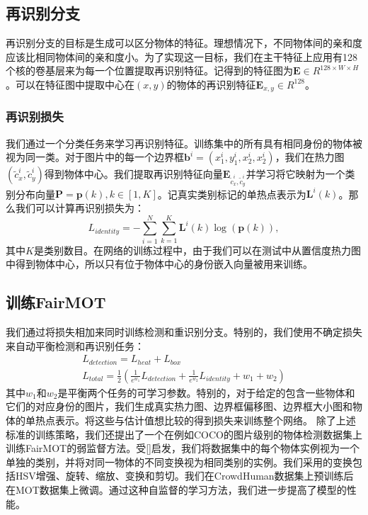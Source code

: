 \documentclass{ctexart}
\begin{document}
\subsection{再识别分支}
再识别分支的目标是生成可以区分物体的特征。理想情况下，不同物体间的亲和度应该比相同物体间的亲和度小。为了实现这一目标，我们在主干特征上应用有128个核的卷基层来为每一个位置提取再识别特征。记得到的特征图为$\bm{E}\in R^{128\times W \times H}$。可以在特征图中提取中心在$(x,y)$的物体的再识别特征$\bm{E}_{x,y}\in R^{128}$。
\subsubsection{再识别损失}
我们通过一个分类任务来学习再识别特征。训练集中的所有具有相同身份的物体被视为同一类。对于图片中的每一个边界框$\bm{b}^i = (x_1^i, y_1^i,x_2^i,x_2^i)$，我们在热力图$(\tilde{c}_x^i, \tilde{c}_y^i)$得到物体中心。我们提取再识别特征向量$\bm{E}_{\tilde{c}_x^i, \tilde{c}_y^i}$并学习将它映射为一个类别分布向量$\bm{P}={\bm{p}(k), k\in [1, K]}$。记真实类别标记的单热点表示为$\bm{L}^i(k)$。那么我们可以计算再识别损失为：
\begin{equation}
    L_{identity}=-\sum_{i=1}^N\sum_{k=1}^K\bm{L}^i(k)\log(\bm{p}(k)),
\end{equation}
其中$K$是类别数目。在网络的训练过程中，由于我们可以在测试中从置信度热力图中得到物体中心，所以只有位于物体中心的身份嵌入向量被用来训练。
\subsection{训练FairMOT}
我们通过将损失相加来同时训练检测和重识别分支。特别的，我们使用不确定损失来自动平衡检测和再识别任务：
\begin{eqnarray}
    L_{detection} = L_{heat} + L_{box} \\
    L_{total}=\frac{1}{2} \left(  \frac{1}{e^{w_1}}L_{detection} + \frac{1}{e^{w_2}}L_{identity} + w_1 + w_2 \right)
\end{eqnarray}
其中$w_1$和$w_2$是平衡两个任务的可学习参数。特别的，对于给定的包含一些物体和它们的对应身份的图片，我们生成真实热力图、边界框偏移图、边界框大小图和物体的单热点表示。将这些与估计值想比较的得到损失来训练整个网络。\newline
除了上述标准的训练策略，我们还提出了一个在例如COCO的图片级别的物体检测数据集上训练FairMOT的弱监督方法。受[]启发，我们将数据集中的每个物体实例视为一个单独的类别，并将对同一物体的不同变换视为相同类别的实例。我们采用的变换包括HSV增强、旋转、缩放、变换和剪切。我们在CrowdHuman数据集上预训练后在MOT数据集上微调。通过这种自监督的学习方法，我们进一步提高了模型的性能。
\end{document}

